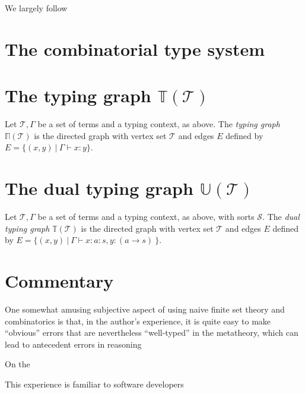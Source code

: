 We largely follow \cite{CombinatorialHomotopyLectures} %

\section{The combinatorial type system}

\section{The typing graph $\mathbb{T}(\mathcal{T})$}

\begin{definition}
    Let $\mathcal{T},\Gamma$ be a set of terms and a typing context, as above. The \emph{typing graph} $\mathbb{\Pi}(\mathcal{T})$ is the directed graph with vertex set $\mathcal{T}$ and edges $E$ defined by $E = \{(x,y)\ | \ \Gamma \vdash x:y \}$.
\end{definition}

\section{The dual typing graph $\mathbb{U}(\mathcal{T})$}

\begin{definition}
    Let $\mathcal{T},\Gamma$ be a set of terms and a typing context, as above, with sorts $\mathcal{S}$. The \emph{dual typing graph} $\mathbb{T}(\mathcal{T})$ is the directed graph with vertex set $\mathcal{T}$ and edges $E$ defined by $E = \{(x,y)\ | \ \Gamma \vdash x:a:s, y:(a \rightarrow s) \ \}$.
\end{definition}

\section{Commentary}

One somewhat amusing subjective aspect of using naive finite set theory and combinatorics is that, in the author's experience, it is quite easy to make ``obvious'' errors that are nevertheless ``well-typed'' in the metatheory, which can lead to antecedent errors in reasoning 

On the

This experience is familiar to software developers